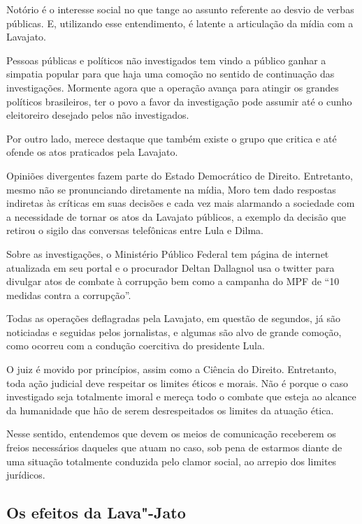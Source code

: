 {Notório é o interesse social no que tange ao assunto referente ao desvio
de verbas públicas. E, utilizando esse entendimento, é latente a
articulação da mídia com a Lavajato.

Pessoas públicas e políticos não investigados tem vindo a público ganhar
a simpatia popular para que haja uma comoção no sentido de continuação
das investigações. Mormente agora que a operação avança para atingir os
grandes políticos brasileiros, ter o povo a favor da investigação pode
assumir até o cunho eleitoreiro desejado pelos não investigados.

Por outro lado, merece destaque que também existe o grupo que critica e
até ofende os atos praticados pela Lavajato.

Opiniões divergentes fazem parte do Estado Democrático de Direito.
Entretanto, mesmo não se pronunciando diretamente na mídia, Moro tem
dado respostas indiretas às críticas em suas decisões e cada vez mais
alarmando a sociedade com a necessidade de tornar os atos da Lavajato
públicos, a exemplo da decisão que retirou o sigilo das conversas
telefônicas entre Lula e Dilma.

Sobre as investigações, o Ministério Público Federal tem página de
internet atualizada em seu portal e o procurador Deltan Dallagnol usa o
twitter para divulgar atos de combate à corrupção bem como a campanha do
MPF de ``10 medidas contra a corrupção''.

Todas as operações deflagradas pela Lavajato, em questão de segundos, já
são noticiadas e seguidas pelos jornalistas, e algumas são alvo de
grande comoção, como ocorreu com a condução coercitiva do presidente
Lula.

O juiz é movido por princípios, assim como a Ciência do Direito.
Entretanto, toda ação judicial deve respeitar os limites éticos e
morais. Não é porque o caso investigado seja totalmente imoral e mereça
todo o combate que esteja ao alcance da humanidade que hão de serem
desrespeitados os limites da atuação ética.

Nesse sentido, entendemos que devem os meios de comunicação receberem os
freios necessários daqueles que atuam no caso, sob pena de estarmos
diante de uma situação totalmente conduzida pelo clamor social, ao
arrepio dos limites jurídicos.

\subsection{Os efeitos da Lava"-Jato}

}
